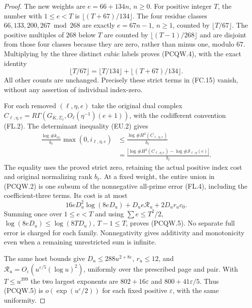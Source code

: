 \begin{proof}
The new weights are $e=66+134n$, $n\geq0$.
For positive integer $T$, the number with $1\leq e<T$ is
$\lfloor(T+67)/134\rfloor$.
The four residue classes $66,133,200,267\bmod268$ are exactly
$e=67n-1$, $n\geq1$, counted by $\lfloor T/67\rfloor$.
The positive multiples of $268$ below $T$ are counted
by $\lfloor(T-1)/268\rfloor$ and are disjoint from those four
classes because they are zero, rather than minus one, modulo $67$.
Multiplying by the three distinct cubic labels proves (PCQW.4),
with the exact identity
\[
 \lfloor T/67\rfloor=\lfloor T/134\rfloor
                               +\lfloor(T+67)/134\rfloor.
 \tag{PCQW.7}
\]
All other counts are unchanged.  Precisely these strict terms
in (FC.15) vanish, without any assertion of individual index-zero.

For each removed $(\ell,\eta,e)$ take the original dual complex
$C_{\ell,\eta,e}=R\Gamma(G_{K,\Sigma_\ell},
O_\ell(\eta^{-1})(e+1))$, with the codifferent convention (FL.2).
The determinant inequality (EU.2) gives
\[
 \begin{aligned}
 \frac{\log\#k_{O_\ell}}{b_\ell}\max(0,i_{\ell,\eta,e})
 &\leq\frac{\log\#H^2(C_{\ell,\eta,e})}{b_\ell}\\
 &=\frac{|\log\#H^2(C_{\ell,\eta,e})
                    -\log\#\mathcal S_{\ell,\eta}(e)|}{b_\ell}.
 \end{aligned}
 \tag{PCQW.8}
\]
The equality uses the proved strict zero, retaining the actual
positive index cost and original normalizing rank $b_\ell$.
At a fixed weight, the entire union in (PCQW.2) is one subsum
of the nonnegative all-prime error (FL.4), including the
coefficient-three terms.  Its cost is at most
\[
          16eD_u^2\log(8eD_u)+D_ue\mathcal R_u+2D_ur_uc_0.
 \tag{PCQW.9}
\]
Summing once over $1\leq e<T$ and using $\sum e\leq T^2/2$,
$\log(8eD_u)\leq\log(8TD_u)$, $T-1\leq T$, proves (PCQW.5).
No separate full error is charged for each family.
Nonnegativity gives additivity and monotonicity even when a
remaining unrestricted sum is infinite.

The same host bounds give $D_u\leq288u^{2+8\varepsilon}$,
$r_u\leq12$, and
$\mathcal R_u=O_\varepsilon(u^{\varepsilon/5}(\log u)^2)$,
uniformly over the prescribed page and pair.
With $T\leq u^{399}$ the two largest exponents are
$802+16\varepsilon$ and $800+41\varepsilon/5$.
Thus (PCQW.5) is $o(\exp(u^\varepsilon/2))$ for each fixed
positive $\varepsilon$, with the same uniformity.


\end{proof}
